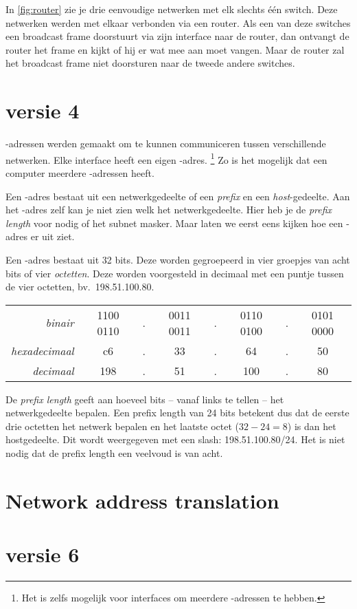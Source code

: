 In \cref{fig:router} zie je drie eenvoudige netwerken met elk slechts één switch.
Deze netwerken werden met elkaar verbonden via een router.
Als een van deze switches een broadcast frame doorstuurt via zijn interface naar de router, dan ontvangt de router het frame en kijkt of hij er wat mee aan moet vangen.
Maar de router zal het broadcast frame niet doorsturen naar de tweede andere switches.


\section{ versie 4}
-adressen werden gemaakt om te kunnen communiceren tussen verschillende netwerken.
Elke interface heeft een eigen -adres.%
    \footnote{Het is zelfs mogelijk voor interfaces om meerdere -adressen te hebben.}
Zo is het mogelijk dat een computer meerdere -adressen heeft.

Een -adres bestaat uit een netwerkgedeelte of een \emph{prefix} en een \emph{host}-gedeelte.
Aan het -adres zelf kan je niet zien welk het netwerkgedeelte.
Hier heb je de \emph{prefix length} voor nodig of het subnet masker.
Maar laten we eerst eens kijken hoe een -adres er uit ziet.

Een -adres bestaat uit 32 bits.
Deze worden gegroepeerd in vier groepjes van acht bits of vier \emph{octetten}.
Deze worden voorgesteld in decimaal met een puntje tussen de vier octetten, bv.~198.51.100.80.

\begin{center}
\small
\begin{tabular}{rccccccc}
\textit{binair}       & 1100 0110 & . & 0011 0011 & . & 0110 0100 & . & 0101 0000 \\
\textit{hexadecimaal} & c6        & . & 33        & . & 64        & . & 50        \\
\textit{decimaal}     & 198       & . & 51        & . & 100       & . & 80        \\
\end{tabular}
\end{center}

De \emph{prefix length} geeft aan hoeveel bits -- vanaf links te tellen -- het netwerkgedeelte bepalen.
Een prefix length van 24 bits betekent dus dat de eerste drie octetten het netwerk bepalen en het laatste octet ($32-24=8$) is dan het hostgedeelte.
Dit wordt weergegeven met een slash: 198.51.100.80/24.
Het is niet nodig dat de prefix length een veelvoud is van acht.


\section{Network address translation}


\section{}
\label{sec:dhcp}

\section{ versie 6}